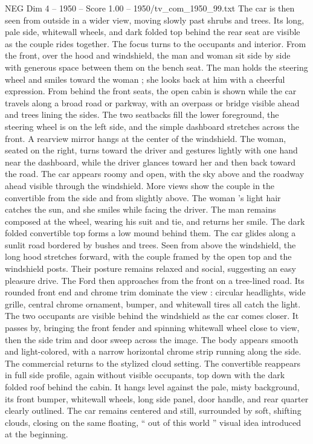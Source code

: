 \begin{textsample}{NEG Dim 4 – 1950 – Score 1.00 – 1950/tv\_com\_1950\_99.txt}
The car is then seen from outside in a wider view, moving slowly past shrubs and trees.
Its long, pale side, whitewall wheels, and dark folded top behind the rear seat are visible as the couple rides together.
The focus turns to the occupants and interior.
From the front, over the hood and windshield, the man and woman sit side by side with generous space between them on the bench seat.
The man holds the steering wheel and smiles toward the woman ; she looks back at him with a cheerful expression.
From behind the front seats, the open cabin is shown while the car travels along a broad road or parkway, with an overpass or bridge visible ahead and trees lining the sides.
The two seatbacks fill the lower foreground, the steering wheel is on the left side, and the simple dashboard stretches across the front.
A rearview mirror hangs at the center of the windshield.
The woman, seated on the right, turns toward the driver and gestures lightly with one hand near the dashboard, while the driver glances toward her and then back toward the road.
The car appears roomy and open, with the sky above and the roadway ahead visible through the windshield.
More views show the couple in the convertible from the side and from slightly above.
The woman ’s light hair catches the sun, and she smiles while facing the driver.
The man remains composed at the wheel, wearing his suit and tie, and returns her smile.
The dark folded convertible top forms a low mound behind them.
The car glides along a sunlit road bordered by bushes and trees.
Seen from above the windshield, the long hood stretches forward, with the couple framed by the open top and the windshield posts.
Their posture remains relaxed and social, suggesting an easy pleasure drive.
The Ford then approaches from the front on a tree-lined road.
Its rounded front end and chrome trim dominate the view : circular headlights, wide grille, central chrome ornament, bumper, and whitewall tires all catch the light.
The two occupants are visible behind the windshield as the car comes closer.
It passes by, bringing the front fender and spinning whitewall wheel close to view, then the side trim and door sweep across the image.
The body appears smooth and light-colored, with a narrow horizontal chrome strip running along the side.
The commercial returns to the stylized cloud setting.
The convertible reappears in full side profile, again without visible occupants, top down with the dark folded roof behind the cabin.
It hangs level against the pale, misty background, its front bumper, whitewall wheels, long side panel, door handle, and rear quarter clearly outlined.
The car remains centered and still, surrounded by soft, shifting clouds, closing on the same floating, “ out of this world ” visual idea introduced at the beginning.

\end{textsample}
